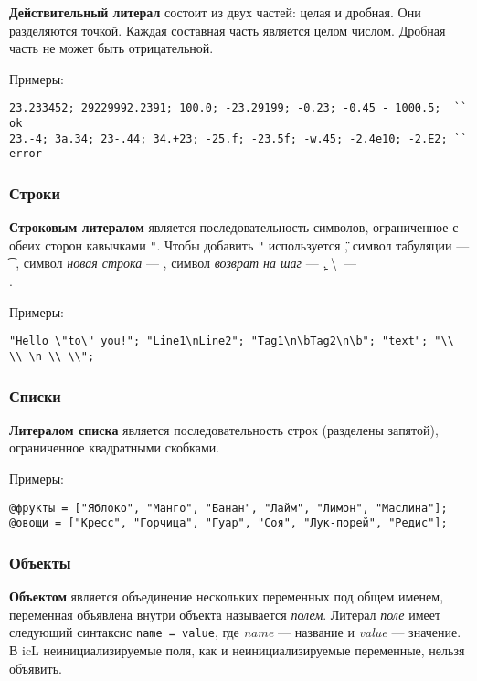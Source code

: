 {\bf Действительный литерал} состоит из двух частей: целая и дробная. Они разделяются точкой. Каждая составная часть является целом числом. Дробная часть не может быть отрицательной.

\noindent Примеры:
\begin{verbatim}
23.233452; 29229992.2391; 100.0; -23.29199; -0.23; -0.45 - 1000.5;  `` ok
23.-4; 3а.34; 23-.44; 34.+23; -25.f; -23.5f; -w.45; -2.4e10; -2.E2; `` error
\end{verbatim}

\subsubsection{Строки}

{\bf Строковым литералом} является последовательность символов, ограниченное с обеих сторон кавычками \texttt{"}. Чтобы добавить \texttt{"} используется \texttt{\"}, символ табуляции — \texttt{\t}, символ {\it новая строка} — \texttt{\n}, символ {\it возврат на шаг} — \texttt{\b}, \textbackslash \ — \texttt{\\}.

\noindent Примеры:
\begin{verbatim}
"Hello \"to\" you!"; "Line1\nLine2"; "Tag1\n\bTag2\n\b"; "text"; "\\ \\ \n \\ \\";
\end{verbatim}

\subsubsection{Списки}

{\bf Литералом списка} является последовательность строк (разделены запятой), ограниченное квадратными скобками.

\noindent Примеры:
\begin{verbatim}
@фрукты = ["Яблоко", "Манго", "Банан", "Лайм", "Лимон", "Маслина"];
@овощи = ["Кресс", "Горчица", "Гуар", "Соя", "Лук-порей", "Редис"];
\end{verbatim}

\subsubsection{Объекты}

{\bf Объектом} является объединение нескольких переменных под общем именем, переменная объявлена внутри объекта называется {\it полем}. Литерал {\it поле} имеет следующий синтаксис \texttt{name = value}, где  {\it name} — название и {\it value} — значение. В icL неинициализируемые поля, как и неинициализируемые переменные, нельзя объявить.

